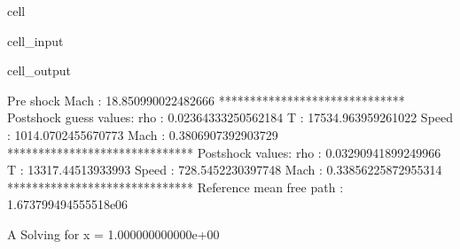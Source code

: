 \documentclass[letterpaper,10pt,english]{jupyterBook}
\begin{document}
\begin{sphinxuseclass}{cell}\begin{sphinxVerbatimInput}

\begin{sphinxuseclass}{cell_input}
\begin{sphinxVerbatim}[commandchars=\\\{\}]
  

    
  
  

\end{sphinxVerbatim}

\end{sphinxuseclass}\end{sphinxVerbatimInput}
\begin{sphinxVerbatimOutput}

\begin{sphinxuseclass}{cell_output}
\begin{sphinxVerbatim}[commandchars=\\\{\}]
Pre shock Mach : 18.850990022482666
******************************
Post\PYGZhy{}shock guess values:
rho    : 0.02364333250562184
T      : 17534.963959261022
Speed  : 1014.0702455670773
Mach   : 0.3806907392903729
******************************
Post\PYGZhy{}shock values:
rho    : 0.03290941899249966
T      : 13317.44513933993
Speed  : 728.5452230397748
Mach   : 0.33856225872955314
******************************
Reference mean free path : 1.673799494555518e\PYGZhy{}06

A Solving for x = 1.000000000000e+00
\end{sphinxVerbatim}

\end{sphinxuseclass}\end{sphinxVerbatimOutput}

\end{sphinxuseclass}
\end{document}
